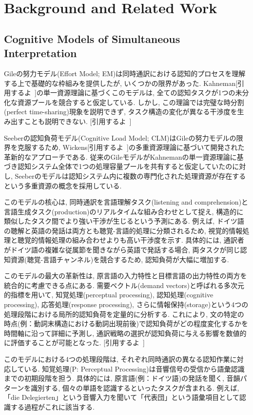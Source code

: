 \section{Background and Related Work}

\subsection{Cognitive Models of Simultaneous Interpretation}

Gileの努力モデル(Effort Model; EM)は同時通訳における認知的プロセスを理解する上で基礎的な枠組みを提供したが, いくつかの限界があった.
Kahneman[引用するよ~]の単一資源理論に基づくこのモデルは, 全ての認知タスクが1つの未分化な資源プールを競合すると仮定している.
しかし, この理論では完璧な時分割(perfect time-sharing)現象を説明できず, タスク構造の変化が異なる干渉度を生み出すことも説明できない.
[引用するよ~]

Seeberの認知負荷モデル(Cognitive Load Model; CLM)はGileの努力モデルの限界を克服するため, Wickens[引用するよ~]の多重資源理論に基づいて開発された革新的なアプローチである.
従来のGileモデルがKahnemanの単一資源理論に基づき認知システム全体で1つの処理容量プールを共有すると仮定していたのに対し, Seeberのモデルは認知システム内に複数の専門化された処理資源が存在するという多重資源の概念を採用している.

このモデルの核心は, 同時通訳を言語理解タスク(listening and comprehension)と言語生成タスク(production)のリアルタイムな組み合わせとして捉え, 構造的に類似したタスク間でより強い干渉が生じるという予測にある.
例えば, ドイツ語の聴解と英語の発話は両方とも聴覚-言語的処理に分類されるため, 視覚的情報処理と聴覚的情報処理の組み合わせよりも高い干渉度を示す.
具体的には, 通訳者がドイツ語の複雑な従属節を聞きながら英語で発話する場合, 両タスクが同じ認知資源(聴覚-言語チャンネル)を競合するため, 認知負荷が大幅に増加する.

このモデルの最大の革新性は, 原言語の入力特性と目標言語の出力特性の両方を統合的に考慮できる点にある.
需要ベクトル(demand vectors)と呼ばれる多次元的指標を用いて, 知覚処理(perceptual processing), 認知処理(cognitive processing), 応答処理(response processing), さらに情報保持(storage)という4つの処理段階における局所的認知負荷を定量的に分析する.
これにより, 文の特定の時点(例：動詞末構造における動詞出現前後)で認知負荷がどの程度変化するかを時間軸に沿って詳細に予測し, 通訳戦略の選択が認知負荷に与える影響を数値的に評価することが可能となった.
[引用するよ~]

このモデルにおける4つの処理段階は, それぞれ同時通訳の異なる認知作業に対応している.
知覚処理(P: Perceptual Processing)は音響信号の受信から語彙認識までの初期段階を担う.
具体的には, 原言語(例：ドイツ語)の発話を聞く, 音韻パターンを識別する, 個々の単語を認識するといったタスクが含まれる.
例えば, 「die Delegierten」という音響入力を聞いて「代表団」という語彙項目として認識する過程がこれに該当する.


